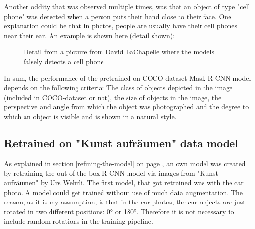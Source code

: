 Another oddity that was observed multiple times, was that an object of type "cell phone" was detected when a person puts their hand close to their face. One explanation could be that in photos, people are usually have their cell phones near their ear. An example is shown here (detail shown):

\begin{figure}[H]
	\caption{\label{fig:fpn} Detail from a picture from David LaChapelle where the models falsely detects a cell phone}
\end{figure}
	
In sum, the performance of the pretrained on COCO-dataset Mask R-CNN model depends on the following criteria: The class of objects depicted in the image (included in COCO-dataset or not), the size of objects in the image, the perspective and angle from which the object was photographed and the degree to which an object is visible and is shown in a natural style.

\subsection{Retrained on "Kunst aufräumen" data model}

As explained in section \ref{refining-the-model} on page \pageref{refining-the-model}, an own model was created by retraining the out-of-the-box R-CNN model via images from "Kunst aufräumen" by Urs Wehrli. The first model, that got retrained was with the car photo. A model could get trained without use of much data augmentation. The reason, as it is my assumption, is that in the car photos, the car objects are just rotated in two different positions: 0\si{\degree} or 180\si{\degree}. Therefore it is not necessary to include random rotations in the training pipeline.

